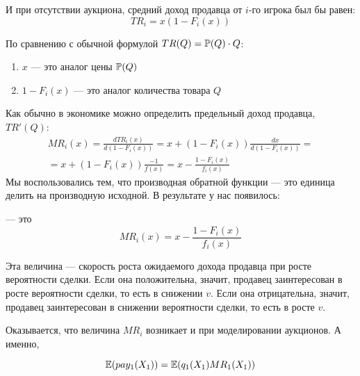 И при отсутствии аукциона, средний доход продавца от $ i $-го игрока был бы равен:
\begin{equation}
TR_{i}=x(1-F_{i}(x))
\end{equation}

По сравнению с обычной формулой $ TR(Q)=\P(Q)\cdot Q $:
\begin{enumerate}
\item $ x $ — это аналог цены $ \P(Q) $
\item $ 1-F_{i}(x) $ — это аналог количества товара $ Q $
\end{enumerate}

Как обычно в экономике можно определить предельный доход продавца, $ TR'(Q) $:
\begin{multline}
MR_{i}(x)=\frac{d TR_{i}(x)}{d(1-F_{i}(x))}=x+(1-F_{i}(x))\frac{dx}{d(1-F_{i}(x))}=\\
=x+(1-F_{i}(x))\frac{-1}{f(x)}=x-\frac{1-F_{i}(x)}{f_{i}(x)}
\end{multline}
Мы воспользовались тем, что производная обратной функции — это единица делить на производную исходной.
В результате у нас появилось:
\begin{mydef}
 — это
\begin{equation}
MR_{i}(x)=x-\frac{1-F_{i}(x)}{f_{i}(x)}
\end{equation}
\end{mydef}

Эта величина — скорость роста ожидаемого дохода продавца при росте вероятности сделки. Если она положительна, значит, продавец заинтересован в росте вероятности сделки, то есть в снижении $ v $. Если она отрицательна, значит, продавец заинтересован в снижении вероятности сделки, то есть в росте $ v $.

Оказывается, что величина $ MR_{i} $ возникает и при моделировании аукционов. А именно,

\begin{myth}
\begin{equation}
\E(pay_{1}(X_{1}))=\E(q_{1}(X_{1})MR_{1}(X_{1}))
\end{equation}
\end{myth}

